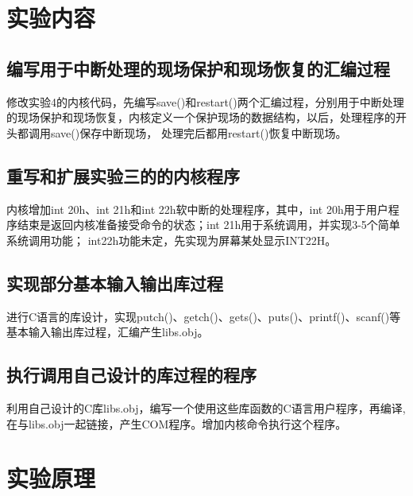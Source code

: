 \documentclass[a4paper, 11pt]{article} %
\begin{document}
\section{实验内容}

\subsection{编写用于中断处理的现场保护和现场恢复的汇编过程}

修改实验4的内核代码，先编写save()和restart()两个汇编过程，分别用于中断处理的现场保护和现场恢复，内核定义一个保护现场的数据结构，以后，处理程序的开头都调用save()保存中断现场，
处理完后都用restart()恢复中断现场。

\subsection{重写和扩展实验三的的内核程序}

内核增加int 20h、int 21h和int 22h软中断的处理程序，其中，int 20h用于用户程序结束是返回内核准备接受命令的状态；int 21h用于系统调用，并实现3-5个简单系统调用功能；
int22h功能未定，先实现为屏幕某处显示INT22H。

\subsection{实现部分基本输入输出库过程}

进行C语言的库设计，实现putch()、getch()、gets()、puts()、printf()、scanf()等基本输入输出库过程，汇编产生libs.obj。

\subsection{执行调用自己设计的库过程的程序}

利用自己设计的C库libs.obj，编写一个使用这些库函数的C语言用户程序，再编译,在与libs.obj一起链接，产生COM程序。增加内核命令执行这个程序。


\section{实验原理}
\end{document}
